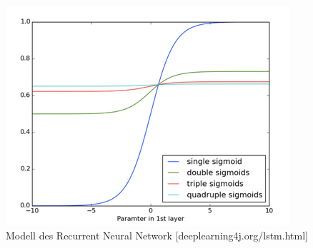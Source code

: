 \begin{figure}[h!]
	\centering
	\includegraphics[width=1\linewidth]{images/vanishing_gradient}
	\caption{Modell des Recurrent Neural Network [deeplearning4j.org/lstm.html]  \cite{GonzalezDominguez.2015}} %
	\label{fig:topology}
\end{figure} 

